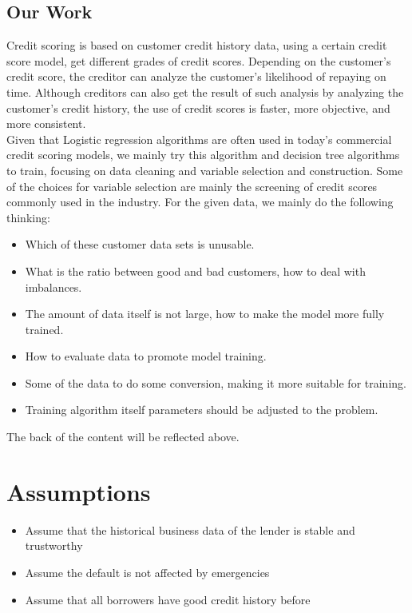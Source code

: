 \documentclass{mcmthesis}
\begin{document}
\subsection{Our Work}
Credit scoring is based on customer credit history data, using a certain credit score model, get different grades of credit scores. Depending on the customer's credit score, the creditor can analyze the customer's likelihood of repaying on time. Although creditors can also get the result of such analysis by analyzing the customer's credit history, the use of credit scores is faster, more objective, and more consistent.\\
\newline
Given that Logistic regression algorithms are often used in today's commercial credit scoring models, we mainly try this algorithm and decision tree algorithms to train, focusing on data cleaning and variable selection and construction. Some of the choices for variable selection are mainly the screening of credit scores commonly used in the industry. For the given data, we mainly do the following thinking:\\
\begin{itemize}
\item Which of these customer data sets is unusable.
\item What is the ratio between good and bad customers, how to deal with imbalances.
\item The amount of data itself is not large, how to make the model more fully trained.
\item How to evaluate data to promote model training.
\item Some of the data to do some conversion, making it more suitable for training.
\item Training algorithm itself parameters should be adjusted to the problem.
\end{itemize}
The back of the content will be reflected above.\\

\section{Assumptions}
\begin{itemize}
\item Assume that the historical business data of the lender is stable and trustworthy
\item Assume the default is not affected by emergencies
\item Assume that all borrowers have good credit history before
\end{itemize}
\end{document}
